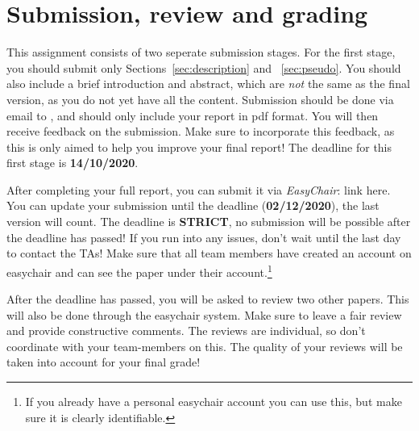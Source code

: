 \documentclass[runningheads]{llncs}
\begin{document}
\section{Submission, review and grading}\label{sec:submission}
This assignment consists of two seperate submission stages. For the first stage, you should submit only Sections~\ref{sec:description} and ~\ref{sec:pseudo}. You should also include a brief introduction and abstract, which are \emph{not} the same as the final version, as you do not yet have all the content. Submission should be done via email to \href{mailto:NACO-TA@liacs.leidenuniv.nl}{}, and should only include your report in pdf format. You will then receive feedback on the submission. Make sure to incorporate this feedback, as this is only aimed to help you improve your final report! The deadline for this first stage is \textbf{14/10/2020}.

After completing your full report, you can submit it via \emph{EasyChair}: {link here}. You can update your submission until the deadline (\textbf{02/12/2020}), the last version will count. The deadline is \textbf{STRICT}, no submission will be possible after the deadline has passed! If you run into any issues, don't wait until the last day to contact the TAs! Make sure that all team members have created an account on easychair and can see the paper under their account.\footnote{If you already have a personal easychair account you can use this, but make sure it is clearly identifiable.}

After the deadline has passed, you will be asked to review two other papers. This will also be done through the easychair system. Make sure to leave a fair review and provide constructive comments. The reviews are individual, so don't coordinate with your team-members on this. The quality of your reviews will be taken into account for your final grade!
\end{document}

